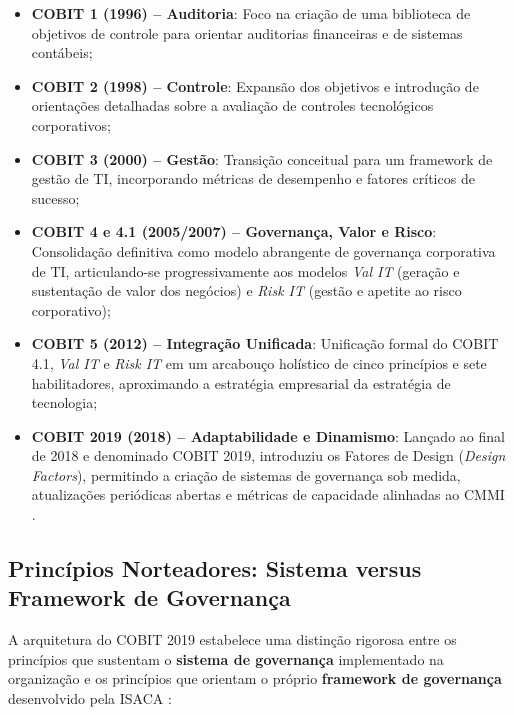 \begin{itemize}
    \item \textbf{COBIT 1 (1996) -- Auditoria}: Foco na criação de uma biblioteca de objetivos de controle para orientar auditorias financeiras e de sistemas contábeis;
    \item \textbf{COBIT 2 (1998) -- Controle}: Expansão dos objetivos e introdução de orientações detalhadas sobre a avaliação de controles tecnológicos corporativos;
    \item \textbf{COBIT 3 (2000) -- Gestão}: Transição conceitual para um framework de gestão de TI, incorporando métricas de desempenho e fatores críticos de sucesso;
    \item \textbf{COBIT 4 e 4.1 (2005/2007) -- Governança, Valor e Risco}: Consolidação definitiva como modelo abrangente de governança corporativa de TI, articulando-se progressivamente aos modelos \textit{Val IT} (geração e sustentação de valor dos negócios) e \textit{Risk IT} (gestão e apetite ao risco corporativo);
    \item \textbf{COBIT 5 (2012) -- Integração Unificada}: Unificação formal do COBIT 4.1, \textit{Val IT} e \textit{Risk IT} em um arcabouço holístico de cinco princípios e sete habilitadores, aproximando a estratégia empresarial da estratégia de tecnologia;
    \item \textbf{COBIT 2019 (2018) -- Adaptabilidade e Dinamismo}: Lançado ao final de 2018 e denominado COBIT 2019, introduziu os Fatores de Design (\textit{Design Factors}), permitindo a criação de sistemas de governança sob medida, atualizações periódicas abertas e métricas de capacidade alinhadas ao CMMI \cite{isaca2019framework,isaca2019design}.
\end{itemize}

\subsection{Princípios Norteadores: Sistema versus Framework de Governança}

A arquitetura do COBIT 2019 estabelece uma distinção rigorosa entre os princípios que sustentam o \textbf{sistema de governança} implementado na organização e os princípios que orientam o próprio \textbf{framework de governança} desenvolvido pela ISACA \cite{isaca2019framework}:


